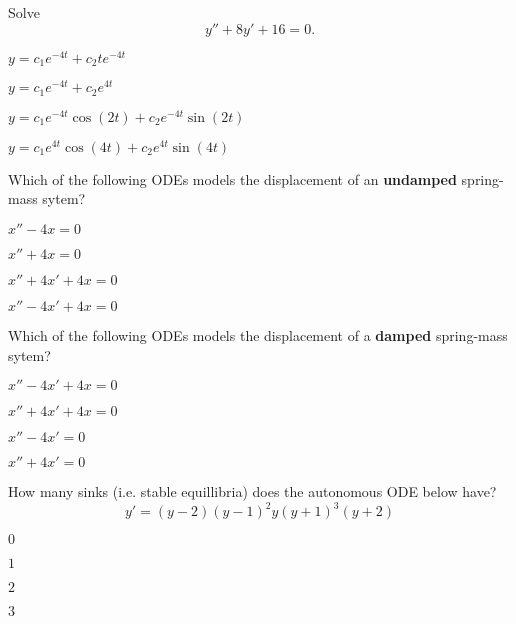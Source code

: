 \begin{readinessAssuranceTest}
\vfill
\item Solve \[y''+8y'+16=0.\]
\begin{multicols}{2}
\begin{readinessAssuranceTestChoices}
\item \(y=c_1 e^{-4t}+c_2 te^{-4t}\)
\item \(y=c_1 e^{-4t}+c_2 e^{4t}\) %
\item \(y=c_1 e^{-4t}\cos(2t)+c_2e^{-4t}\sin(2t)\) 
\item \(y=c_1 e^{4t}\cos(4t)+c_2e^{4t}\sin(4t)\) 
\end{readinessAssuranceTestChoices}
\end{multicols}
\vfill

\newpage
\item %
Which of the following ODEs models the displacement of an \textbf{undamped} spring-mass sytem?
\begin{multicols}{4}
\begin{readinessAssuranceTestChoices}
\item \(x''-4x=0\)
\item \(x''+4x=0\) %
\item \(x''+4x'+4x=0\) 
\item \(x''-4x'+4x=0\) 
\end{readinessAssuranceTestChoices}
\end{multicols}
\vfill

\item Which of the following ODEs models the displacement of a \textbf{damped} spring-mass sytem?
\begin{multicols}{4}
\begin{readinessAssuranceTestChoices}
\item \(x''-4x'+4x=0\) 
\item \(x''+4x'+4x=0\) %
\item \(x''-4x'=0\)
\item \(x''+4x'=0\) 
\end{readinessAssuranceTestChoices}
\end{multicols}

\vfill
\item %
How many sinks (i.e. stable equillibria) does the autonomous ODE below have?
\[ y'=(y-2)(y-1)^2y(y+1)^3(y+2)\]
\begin{multicols}{4}
\begin{readinessAssuranceTestChoices}
\item \(0\) 
\item \(1\)
\item \(2\) %
\item \(3\) 
\end{readinessAssuranceTestChoices}
\end{multicols}
\vfill


\end{readinessAssuranceTest}
